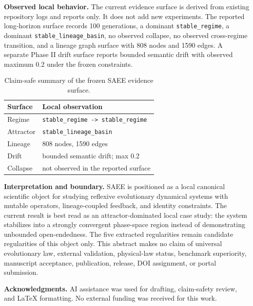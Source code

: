 \documentclass[10pt]{article}
\begin{document}
\textbf{Observed local behavior.}
The current evidence surface is derived from existing repository logs and
reports only. It does not add new experiments. The reported long-horizon
surface records 100 generations, a dominant \texttt{stable\_regime}, a
dominant \texttt{stable\_lineage\_basin}, no observed collapse, no observed
cross-regime transition, and a lineage graph surface with 808 nodes and 1590
edges. A separate Phase II drift surface reports bounded semantic drift with
observed maximum 0.2 under the frozen constraints.

\begin{table}[h]
\centering
\small
\begin{tabular}{ll}
\toprule
Surface & Local observation \\
\midrule
Regime & \texttt{stable\_regime -> stable\_regime} \\
Attractor & \texttt{stable\_lineage\_basin} \\
Lineage & 808 nodes, 1590 edges \\
Drift & bounded semantic drift; max 0.2 \\
Collapse & not observed in the reported surface \\
\bottomrule
\end{tabular}
\caption{Claim-safe summary of the frozen SAEE evidence surface.}
\end{table}

\textbf{Interpretation and boundary.}
SAEE is positioned as a local canonical scientific object for studying
reflexive evolutionary dynamical systems with mutable operators,
lineage-coupled feedback, and identity constraints. The current result is
best read as an attractor-dominated local case study: the system stabilizes
into a strongly convergent phase-space region instead of demonstrating
unbounded open-endedness. The five extracted regularities remain candidate
regularities of this object only. This abstract makes no claim of universal
evolutionary law, external validation, physical-law status, benchmark
superiority, manuscript acceptance, publication, release, DOI assignment, or
portal submission.

\textbf{Acknowledgments.}
AI assistance was used for drafting, claim-safety review, and LaTeX formatting.
No external funding was received for this work.
\end{document}

